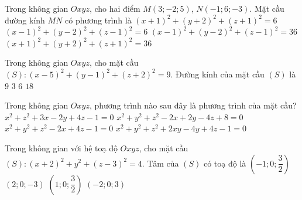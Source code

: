 \begin{ex}%
	Trong không gian $Oxyz$, cho hai điểm $M\left(3;-2;5\right)$, $N\left(-1;6;-3\right)$. Mặt cầu đường kính $MN$ có phương trình là
	\choice
	{$\left(x+1\right)^2+\left(y+2\right)^2+\left(z+1\right)^2=6$}
	{$\left(x-1\right)^2+\left(y-2\right)^2+\left(z-1\right)^2=6$}
	{\True $\left(x-1\right)^2+\left(y-2\right)^2+\left(z-1\right)^2=36$}
	{$\left(x+1\right)^2+\left(y+2\right)^2+\left(z+1\right)^2=36$}
\end{ex}

\begin{ex}%
	Trong không gian $Oxyz$, cho mặt cầu $(S)\colon \left(x-5\right)^2+\left(y-1\right)^2+\left(z+2\right)^2=9$. Đường kính của mặt cầu $(S)$ là
	\choice
	{$9$}
	{$3$}
	{\True $6$}
	{$18$}
\end{ex}

\begin{ex}%
	Trong không gian $Oxyz$, phương trình nào sau đây là phương trình của mặt cầu?
	\choice
	{$x^2+z^2+3x-2y+4z-1=0$}
	{$x^2+y^2+z^2-2x+2y-4z+8=0$}
	{\True $x^2+y^2+z^2-2x+4z-1=0$}
	{$x^2+y^2+z^2+2xy-4y+4z-1=0$}
\end{ex}

\begin{ex}%
	Trong không gian với hệ toạ độ $Oxyz$,  cho mặt cầu $(S):(x+2)^2+y^2+\left(z-3\right)^2=4$. Tâm của $(S)$ có toạ độ là
	\choice
	{$\left(-1;0;\dfrac{3}{2} \right)$}
	{$\left(2;0;-3\right)$}
	{$\left(1;0;\dfrac{3}{2} \right)$}
	{\True $\left(-2;0;3\right)$}
\end{ex}

